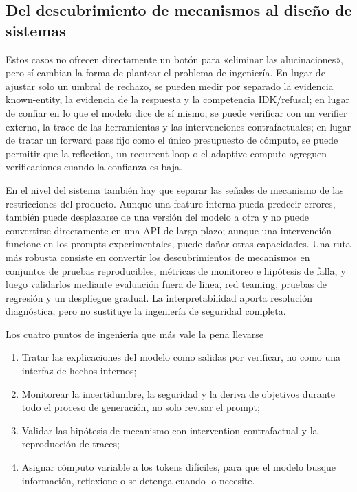 \documentclass[a4paper]{article}
\begin{document}
\subsection{Del descubrimiento de mecanismos al diseño de sistemas}

Estos casos no ofrecen directamente un botón para «eliminar las alucinaciones», pero sí cambian la forma de plantear el problema de ingeniería. En lugar de ajustar solo un umbral de rechazo, se pueden medir por separado la evidencia known-entity, la evidencia de la respuesta y la competencia IDK/refusal; en lugar de confiar en lo que el modelo dice de sí mismo, se puede verificar con un verifier externo, la trace de las herramientas y las intervenciones contrafactuales; en lugar de tratar un forward pass fijo como el único presupuesto de cómputo, se puede permitir que la reflection, un recurrent loop o el adaptive compute agreguen verificaciones cuando la confianza es baja.

En el nivel del sistema también hay que separar las señales de mecanismo de las restricciones del producto. Aunque una feature interna pueda predecir errores, también puede desplazarse de una versión del modelo a otra y no puede convertirse directamente en una API de largo plazo; aunque una intervención funcione en los prompts experimentales, puede dañar otras capacidades. Una ruta más robusta consiste en convertir los descubrimientos de mecanismos en conjuntos de pruebas reproducibles, métricas de monitoreo e hipótesis de falla, y luego validarlos mediante evaluación fuera de línea, red teaming, pruebas de regresión y un despliegue gradual. La interpretabilidad aporta resolución diagnóstica, pero no sustituye la ingeniería de seguridad completa.


\begin{importantbox}{Los cuatro puntos de ingeniería que más vale la pena llevarse}
\begin{enumerate}
  \item Tratar las explicaciones del modelo como salidas por verificar, no como una interfaz de hechos internos;
  \item Monitorear la incertidumbre, la seguridad y la deriva de objetivos durante todo el proceso de generación, no solo revisar el prompt;
  \item Validar las hipótesis de mecanismo con intervention contrafactual y la reproducción de traces;
  \item Asignar cómputo variable a los tokens difíciles, para que el modelo busque información, reflexione o se detenga cuando lo necesite.
\end{enumerate}
\end{importantbox}
\end{document}
